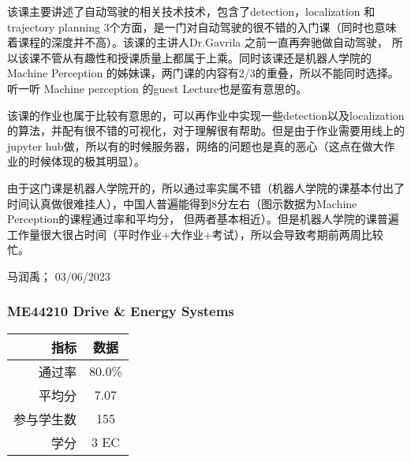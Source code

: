 该课主要讲述了自动驾驶的相关技术技术，包含了detection，localization 和 trajectory planning 3个方面，是一门对自动驾驶的很不错的入门课（同时也意味着课程的深度并不高）。该课的主讲人Dr.Gavrila 之前一直再奔驰做自动驾驶， 所以该课不管从有趣性和授课质量上都属于上乘。同时该课还是机器人学院的Machine Perception 的姊妹课，两门课的内容有2/3的重叠，所以不能同时选择。听一听 Machine perception 的guest Lecture也是蛮有意思的。

该课的作业也属于比较有意思的，可以再作业中实现一些detection以及localization的算法，并配有很不错的可视化，对于理解很有帮助。但是由于作业需要用线上的jupyter hub做，所以有的时候服务器，网络的问题也是真的恶心（这点在做大作业的时候体现的极其明显）。

由于这门课是机器人学院开的，所以通过率实属不错（机器人学院的课基本付出了时间认真做很难挂人），中国人普遍能得到8分左右（图示数据为Machine Perception的课程通过率和平均分， 但两者基本相近）。但是机器人学院的课普遍工作量很大很占时间（平时作业+大作业+考试），所以会导致考期前两周比较忙。

\begin{flushright}
马润禹； 03/06/2023
\end{flushright}

\subsubsection{ME44210 Drive \& Energy Systems}
\begin{minipage}{0.45\textwidth}
\centering
{}
\end{minipage}%
\begin{minipage}{0.45\textwidth}
\raggedleft
\begin{tabular}{r|c}
\textbf{指标} & \textbf{数据} \\ \hline
通过率 & 80.0\% \\ 
平均分 & 7.07 \\ 
参与学生数 & 155 \\ 
学分 & 3 EC\\
\end{tabular}
\end{minipage}\\

